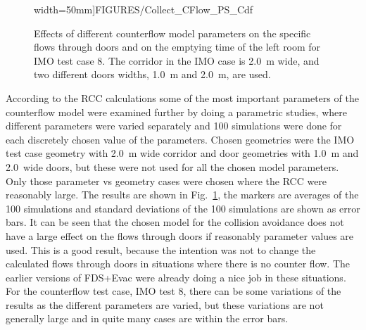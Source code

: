 \documentclass[12pt,a4paper,final,twoside]{stylevk}
\begin{document}
\begin{figure}[!ht]
{  width=50mm]{FIGURES/Collect_CFlow_PS_Cdf} }  
  \caption{Effects of different counterflow model parameters on the
    specific flows through doors and on the emptying time of the left
    room for IMO test case 8.  The corridor in the IMO case is 2.0~m
    wide, and two different doors widths, 1.0~m and 2.0~m, are
    used.}\label{Fig_CFParametric}
\end{figure}
%

According to the RCC calculations some of the most important
parameters of the counterflow model were examined further by doing a
parametric studies, where different parameters were varied separately
and 100 simulations were done for each discretely chosen value of the
parameters.  Chosen geometries were the IMO test case geometry with
2.0~m wide corridor and door geometries with 1.0~m and 2.0~wide doors,
but these were not used for all the chosen model parameters.  Only
those parameter vs geometry cases were chosen where the RCC were
reasonably large.  The results are shown in
Fig.~\ref{Fig_CFParametric}, the markers are averages of the 100
simulations and standard deviations of the 100 simulations are shown
as error bars.  It can be seen that the chosen model for the collision
avoidance does not have a large effect on the flows through doors if
reasonably parameter values are used.  This is a good result, because
the intention was not to change the calculated flows through doors in
situations where there is no counter flow.  The earlier versions of
FDS+Evac were already doing a nice job in these situations.  For the
counterflow test case, IMO test 8, there can be some variations of the
results as the different parameters are varied, but these variations
are not generally large and in quite many cases are within the error
bars.
\end{document}
